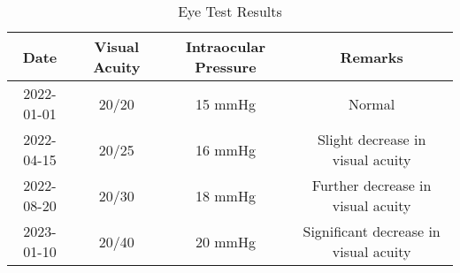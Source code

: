\begin{table}[htbp]
\centering
\caption{Eye Test Results}
\begin{tabular}{|c|c|c|c|}
\hline
\textbf{Date} & \textbf{Visual Acuity} & \textbf{Intraocular Pressure} & \textbf{Remarks} \\ \hline
2022-01-01 & 20/20 & 15 mmHg & Normal \\
2022-04-15 & 20/25 & 16 mmHg & Slight decrease in visual acuity \\
2022-08-20 & 20/30 & 18 mmHg & Further decrease in visual acuity \\
2023-01-10 & 20/40 & 20 mmHg & Significant decrease in visual acuity \\
\hline
\end{tabular}
\end{table}